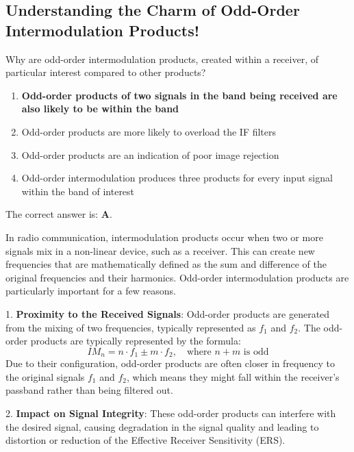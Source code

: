 \subsection*{Understanding the Charm of Odd-Order Intermodulation Products!}

\begin{tcolorbox}[colback=gray!10, colframe=black, title=E4D11`]
Why are odd-order intermodulation products, created within a receiver, of particular interest compared to other products? 

\begin{enumerate}[label=\Alph*.]
    \item \textbf{Odd-order products of two signals in the band being received are also likely to be within the band}
    \item Odd-order products are more likely to overload the IF filters
    \item Odd-order products are an indication of poor image rejection
    \item Odd-order intermodulation produces three products for every input signal within the band of interest
\end{enumerate} \end{tcolorbox}

The correct answer is: \textbf{A}.

In radio communication, intermodulation products occur when two or more signals mix in a non-linear device, such as a receiver. This can create new frequencies that are mathematically defined as the sum and difference of the original frequencies and their harmonics. Odd-order intermodulation products are particularly important for a few reasons.

1. \textbf{Proximity to the Received Signals}: Odd-order products are generated from the mixing of two frequencies, typically represented as \( f_1 \) and \( f_2 \). The odd-order products are typically represented by the formula:
   \[
   IM_{n} = n \cdot f_1 \pm m \cdot f_2, \quad \text{where } n+m \text{ is odd}
   \]
   Due to their configuration, odd-order products are often closer in frequency to the original signals \( f_1 \) and \( f_2 \), which means they might fall within the receiver's passband rather than being filtered out.

2. \textbf{Impact on Signal Integrity}: These odd-order products can interfere with the desired signal, causing degradation in the signal quality and leading to distortion or reduction of the Effective Receiver Sensitivity (ERS). 

